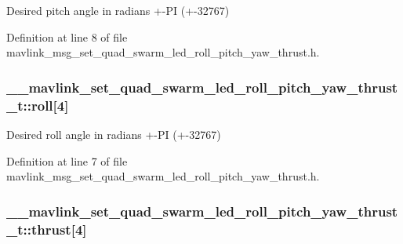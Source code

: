 Desired pitch angle in radians +-\/\-P\-I (+-\/32767) 



Definition at line 8 of file mavlink\-\_\-msg\-\_\-set\-\_\-quad\-\_\-swarm\-\_\-led\-\_\-roll\-\_\-pitch\-\_\-yaw\-\_\-thrust.\-h.

\hypertarget{struct____mavlink__set__quad__swarm__led__roll__pitch__yaw__thrust__t_a7e6673c156d61785d094f6642a088152}{
\subsubsection[{roll}]{ \-\_\-\-\_\-mavlink\-\_\-set\-\_\-quad\-\_\-swarm\-\_\-led\-\_\-roll\-\_\-pitch\-\_\-yaw\-\_\-thrust\-\_\-t\-::roll\mbox{[}4\mbox{]}}}\label{struct____mavlink__set__quad__swarm__led__roll__pitch__yaw__thrust__t_a7e6673c156d61785d094f6642a088152}


Desired roll angle in radians +-\/\-P\-I (+-\/32767) 



Definition at line 7 of file mavlink\-\_\-msg\-\_\-set\-\_\-quad\-\_\-swarm\-\_\-led\-\_\-roll\-\_\-pitch\-\_\-yaw\-\_\-thrust.\-h.

\hypertarget{struct____mavlink__set__quad__swarm__led__roll__pitch__yaw__thrust__t_ab4a629433cf1e7a83f7e6ace99a738c7}{
\subsubsection[{thrust}]{ \-\_\-\-\_\-mavlink\-\_\-set\-\_\-quad\-\_\-swarm\-\_\-led\-\_\-roll\-\_\-pitch\-\_\-yaw\-\_\-thrust\-\_\-t\-::thrust\mbox{[}4\mbox{]}}}\label{struct____mavlink__set__quad__swarm__led__roll__pitch__yaw__thrust__t_ab4a629433cf1e7a83f7e6ace99a738c7}


